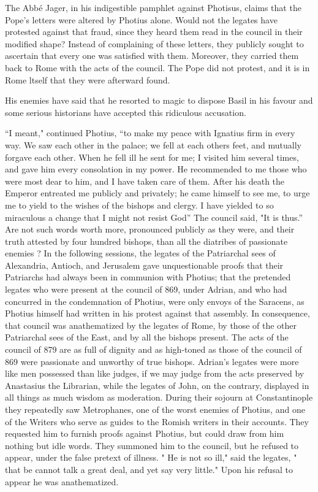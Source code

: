 The Abbé Jager, in his indigestible pamphlet against Photisus, claims that the Pope's letters were altered by Photius alone. Would not the legates have protested against that fraud, since they heard them read in the council in their modified shape? Instead of complaining of these letters, they publicly sought to ascertain that every one was satisfied with them. Moreover, they carried them back to Rome with the acts of the council. The Pope did not protest, and it is in Rome ltself that they were afterward found.

His enemies have said that he resorted to magic to dispose Basil in his favour and some serious historians have accepted this ridiculous accusation.

“I meant," continued Photius, “to make my peace with Ignatius firm in every way. We saw each other in the palace; we fell at each others feet, and mutually forgave each other. When he fell ill he sent for me; I visited him several times, and gave him every consolation in my power. He recommended to me those who were most dear to him, and I have taken care of them. After his death the Emperor entreated me publicly and privately; he came himself to see me, to urge me to yield to the wishes of the bishops and clergy. I have yielded to so miraculous a change that I might not resist God” The council said, "It is thus.” Are not such words worth more, pronounced publicly as they were, and their truth attested by four hundred bishops, than all the diatribes of passionate enemies ? In the following sessions, the legates of the Patriarchal sees of Alexandria, Antioch, and Jerusalem gave unquestionable proofs that their Patriarchs had always been in communion with Photius; that the pretended legates who were present at the council of 869, under Adrian, and who had concurred in the condemnation of Photius, were only envoys of the Saracens, as Photius himself had written in his protest against that assembly. In consequence, that council was anathematized by the legates of Rome, by those of the other Patriarchal sees of the East, and by all the bishops present. The acts of the council of 879 are as full of dignity and as high-toned as those of the council of 869 were passionate and unworthy of true bishops. Adrian's legates were more like men possessed than like judges, if we may judge from the acts preserved by Anastasius the Librarian, while the legates of John, on the contrary, displayed in all things as much wisdom as moderation. During their sojourn at Constantinople they repeatedly saw Metrophanes, one of the worst enemies of Photius, and one of the Writers who serve as guides to the Romish writers in their accounts. They requested him to furnish proofs against Photius, but could draw from him nothing but idle words. They summoned him to the council, but he refused to appear, under the false pretext of illness. " He is not so ill," said the legates, " that be cannot talk a great deal, and yet say very little." Upon his refusal to appear he was anathematized.

